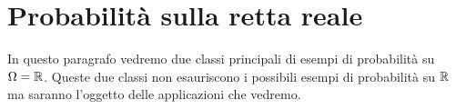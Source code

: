 \section{Probabilità sulla retta reale}
In questo paragrafo vedremo due classi principali di esempi di probabilità su $\Omega = \mathbb{R}$.
Queste due classi non esauriscono i possibili esempi di probabilità su $\mathbb{R}$ ma saranno l'oggetto
delle applicazioni che vedremo.